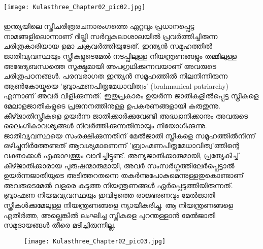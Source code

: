 \label{ch2box1} %
\begin{tcolorbox}[%
  breakable, %
  arc=0mm, 
  left=1pt, right = 1pt, 
  boxrule=0mm,
  colback = {blue!10}, %
] 

{\begin{center}
\texttt{[image: Kulasthree\_Chapter02\_pic02.jpg]}
\end{center}
\paragraph{}ഇന്ത്യയിലെ സ്ത്രീചരിത്രരചനാരംഗത്തെ ഏറ്റവും പ്രധാനപ്പെട്ട നാമങ്ങളിലൊന്നാണ് ദില്ലി സർവ്വകലാശാലയിൽ പ്രവർത്തിച്ചിരുന്ന ചരിത്രകാരിയായ ഉമാ ചക്രവർത്തിയുടേത്. ഇന്ത്യൻ സമൂഹത്തിൽ ജാതിവ്യവസ്ഥയും സ്ത്രീകളുടെമേൽ നടപ്പിലുള്ള നിയന്ത്രണങ്ങളും തമ്മിലുള്ള അഭേദ്യബന്ധത്തെ സൂക്ഷ്മമായി അപഗ്രഥിക്കുന്നവയാണ് അവരുടെ ചരിത്രപഠനങ്ങൾ. പരമ്പരാഗത ഇന്ത്യൻ സമൂഹത്തിൽ നിലനിന്നിരുന്ന ആൺകോയ്മയെ 'ബ്രാഹ്മണപിതൃമേധാവിത്വം' (brahmanical patriarchy) എന്നാണ് അവർ വിളിക്കുന്നത്. ഇതുപ്രകാരം ഉയർന്ന ജാതികളിൽപ്പെട്ട സ്ത്രീകളെ മേലാളജാതികളുടെ പ്രജനനത്തിനുള്ള ഉപകരണങ്ങളായി കരുതുന്നു. കീഴ്ജാതിസ്ത്രീകളെ ഉയർന്ന ജാതിക്കാർക്കുവേണ്ടി അദ്ധ്വാനിക്കാനും അവരുടെ ലൈംഗികാവശ്യങ്ങൾ നിവർത്തിക്കുന്നതിനായും നിയോഗിക്കുന്നു. ജാതിവ്യവസ്ഥയെ സംരക്ഷിക്കുന്നതിന് മേൽജാതി സ്ത്രീകളെ സമൂഹത്തിൽനിന്ന് ഒഴിച്ചുനിർത്തേണ്ടത് ആവശ്യമാണെന്ന് 'ബ്രാഹ്മണപിതൃമേധാവിത്വ'ത്തിന്റെ വക്താക്കൾ എക്കാലത്തും വാദിച്ചിട്ടുണ്ട്. അന്യജാതിക്കാരുമായി, പ്രത്യേകിച്ച് കീഴ്ജാതിക്കാരായ പുരുഷന്മാരുമായി, അവർ സംസർഗ്ഗത്തിലേർപ്പെട്ടാൽ ഉയർന്നജാതിയുടെ അടിത്തറതന്നെ തകർന്നുപോകുമെന്നുള്ളതുകൊണ്ടാണ് അവരുടെമേൽ വളരെ കടുത്ത നിയന്ത്രണങ്ങൾ ഏർപ്പെടുത്തിയിരുന്നത്. ബ്രാഹ്മണ നിയമവ്യവസ്ഥയും ഇവിടുത്തെ രാജഭരണവും മേൽജാതി സ്ത്രീകൾക്കുമേലുള്ള നിയന്ത്രണങ്ങളെ ന്യായീകരിച്ചു. ആ നിയന്ത്രണങ്ങളെ എതിർത്ത, അല്ലെങ്കിൽ ലംഘിച്ച സ്ത്രീകളെ പുറന്തള്ളാൻ മേൽജാതി സമുദായങ്ങൾ തീരെ മടിച്ചിരുന്നില്ല.}
\end{tcolorbox}

\begin{figure}[h]
\begin{center}
\texttt{[image: Kulasthree\_Chapter02\_pic03.jpg]}
\end{center}
\end{figure}

